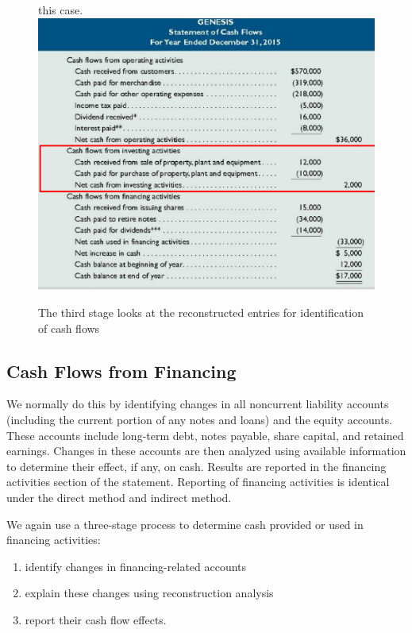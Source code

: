 \documentclass[../main.tex]{subfiles}
\begin{document}
\begin{figure}[ht!]
{		this case.}
		\includegraphics[width=1\columnwidth]{images/c11/third_stage_investing.png}
		\caption{The third stage looks at the reconstructed entries for 
		identification of cash flows}	
	\end{figure}
	\subsection{Cash Flows from Financing}
	
	We normally do this by identifying changes in all noncurrent liability 
	accounts (including the current portion of any notes and loans) and the 
	equity accounts. These accounts include long-term debt, notes payable, 
	share capital, and retained earnings. Changes in these accounts are then 
	analyzed using available information to determine their effect, if any, on 
	cash. Results are reported in the financing activities section of the 
	statement. Reporting of financing activities is identical under the direct 
	method and indirect method.
	
	We again use a three-stage process to determine cash provided or used in 
	financing activities:
	\begin{enumerate}[noitemsep]
		\item identify changes in financing-related accounts
		\item explain these changes using reconstruction analysis
		\item report their cash flow effects.
	\end{enumerate}
\end{document}

